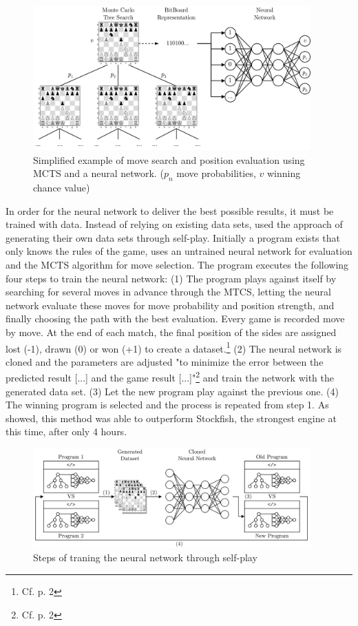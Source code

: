\begin{figure}[h]
\centering
\includegraphics[width=0.95\textwidth]{graphics/alphazero/alphazero.png}
\caption{Simplified example of move search and position evaluation using MCTS and a neural network. ($p_{n}$ move probabilities, $v$ winning chance value)}
\label{fig:pae}
\end{figure}

In order for the neural network to deliver the best possible results, it must be trained with data. Instead of relying on existing data sets, \cite{alphazero-2018} used the approach of generating their own data sets through self-play. Initially a program exists that only knows the rules of the game, uses an untrained neural network for evaluation and the MCTS algorithm for move selection. The program executes the following four steps to train the neural network: (1) The program plays against itself by searching for several moves in advance through the MTCS, letting the neural network evaluate these moves for move probability and position strength, and finally choosing the path with the best evaluation. Every game is recorded move by move. At the end of each match, the final position of the sides are assigned lost (-1), drawn (0) or won (+1) to create a dataset.\footnote{Cf. \cite{alphazero-2018} p. 2} (2) The neural network is cloned and the parameters are adjusted "to minimize the error between the predicted result [...] and the game result [...]"\footnote{Cf. \cite{alphazero-2018} p. 2} and train the network with the generated data set. (3) Let the new program play against the previous one. (4) The winning program is selected and the process is repeated from step 1. As \cite{alphazero-2018}  showed, this method was able to outperform Stockfish, the strongest engine at this time, after only 4 hours.

\begin{figure}[h]
\centering
\includegraphics[width=0.95\textwidth]{graphics/alphazero/selfplay.png}
\caption{Steps of traning the neural network through self-play}
\end{figure}
